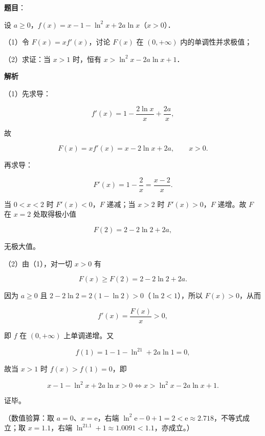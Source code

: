 \begin{answer}

\textbf{题目}：

设 $a\geqslant0$，$f(x)=x-1-\ln^2x+2a\ln x$（$x>0$）．

（1）令 $F(x)=xf'(x)$，讨论 $F(x)$ 在 $(0,+\infty)$ 内的单调性并求极值；

（2）求证：当 $x>1$ 时，恒有 $x>\ln^2x-2a\ln x+1$．

\textbf{解析}

（1）先求导：

\nopagebreak[4]
\[f'(x)=1-\frac{2\ln x}{x}+\frac{2a}{x},\]

故

\nopagebreak[4]
\[F(x)=xf'(x)=x-2\ln x+2a,\qquad x>0.\]

再求导：

\nopagebreak[4]
\[F'(x)=1-\frac2x=\frac{x-2}{x}.\]

当 $0<x<2$ 时 $F'(x)<0$，$F$ 递减；当 $x>2$ 时 $F'(x)>0$，$F$ 递增。故 $F$ 在 $x=2$ 处取得极小值

\nopagebreak[4]
\[F(2)=2-2\ln2+2a,\]

无极大值。

（2）由（1），对一切 $x>0$ 有

\nopagebreak[4]
\[F(x)\geqslant F(2)=2-2\ln2+2a.\]

因为 $a\geqslant0$ 且 $2-2\ln2=2(1-\ln2)>0$（$\ln2<1$），所以 $F(x)>0$，从而

\nopagebreak[4]
\[f'(x)=\frac{F(x)}{x}>0,\]

即 $f$ 在 $(0,+\infty)$ 上单调递增。又

\nopagebreak[4]
\[f(1)=1-1-\ln^21+2a\ln1=0,\]

故当 $x>1$ 时 $f(x)>f(1)=0$，即

\nopagebreak[4]
\[x-1-\ln^2x+2a\ln x>0\iff x>\ln^2x-2a\ln x+1.\]

证毕。

（数值验算：取 $a=0$、$x=\mathrm e$，右端 $\ln^2\mathrm e-0+1=2<\mathrm e\approx2.718$，不等式成立；取 $x=1.1$，右端 $\ln^21.1+1\approx1.0091<1.1$，亦成立。）


\end{answer}
